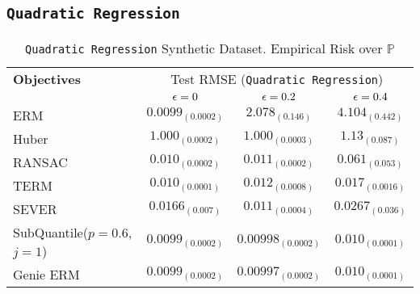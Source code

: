 \documentclass{article} %
\newcommand{\subhead}[1]{\multicolumn{1}{c}{#1}}%
\begin{document}
\begin{appendices}
	\subsection{\texttt{Quadratic Regression}}
	\begin{table}[!h]
	\centering
	\begin{tabular}{lccc}
		\toprule 
		\textbf{Objectives}&\multicolumn{3}{c}{Test RMSE (\texttt{Quadratic Regression})}\\                   
		\cmidrule(rl){2-4}
		&\subhead{${\epsilon} = 0$}& \subhead{${\epsilon} = 0.2$}& \subhead{${\epsilon} = 0.4$}\\ 
		\midrule
		ERM  &$0.0099_{(0.0002)}$&$2.078_{(0.146)}$&$4.104_{(0.442)}$\\
		Huber \cite{Huber2009} &$1.000_{(0.0002)}$&$1.000_{(0.0003)}$&$1.13_{(0.087)}$\\
		RANSAC \cite{RANSAC1981} &$0.010_{(0.0002)}$&$0.011_{(0.0002)}$&$0.061_{(0.053)}$\\
		TERM \cite{li2020tilted} &$0.010_{(0.0001)}$&$0.012_{(0.0008)}$&$0.017_{(0.0016)}$\\
		SEVER \cite{DiakonikolasKKLSS19} &$0.0166_{(0.007)}$&$0.011_{(0.0004)}$&$0.0267_{(0.036)}$\\
		\rowcolor{LightCyan}
		SubQuantile($p = 0.6$,$j=1$) &$\mathbf{0.0099_{(0.0002)}}$&$\mathbf{0.00998_{(0.0002)}}$&$\mathbf{0.010_{(0.0001)}}$\\
		\midrule 
		Genie ERM &$0.0099_{(0.0002)}$&$0.00997_{(0.0002)}$&$0.010_{(0.0001)}$\\
		\bottomrule
	\end{tabular}
	\caption{\texttt{Quadratic Regression} Synthetic Dataset. Empirical Risk over $\mathbb{P}$}
	\label{tab:quadratic-regression}
	\end{table}


\end{appendices}
\end{document}
